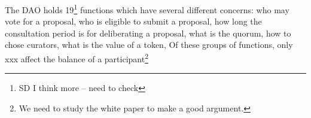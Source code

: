  

\noindent

The DAO holds 19\footnote{SD I think more -- need to check} functions which have several different concerns:
who may vote   for a proposal, who is eligible to submit a proposal,
how long the consultation period is for deliberating a proposal, what
is the quorum, how to chose curators, what is the value of a token,
Of these groups of functions, only xxx affect the balance of a
participant\footnote{We need to study the white paper to make a good
argument.} 
 
